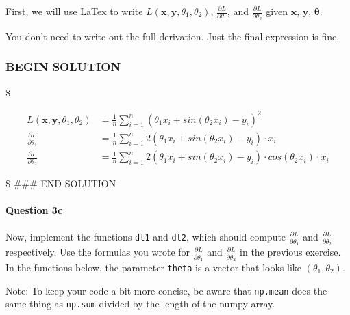 \documentclass[11pt]{article}
\begin{document}
First, we will use LaTex to write
\(L(\textbf{x}, \textbf{y}, \theta_1, \theta_2)\),
\(\frac{\partial L }{\partial \theta_1}\), and
\(\frac{\partial L }{\partial \theta_2}\) given \(\textbf{x}\),
\(\textbf{y}\), \(\boldsymbol{\theta}\).

You don't need to write out the full derivation. Just the final
expression is fine.

    \subsubsection{BEGIN SOLUTION}\label{begin-solution}

\$

\begin{align*}
L(\textbf{x}, \textbf{y}, \theta_1, \theta_2) &= \frac{1}{n} \sum_{i=1}^n (\theta_1 x_i + sin(\theta_2 x_i) - y_i)^2 \\
\frac{\partial L}{\partial \theta_1} &= \frac{1}{n} \sum_{i=1}^n 2(\theta_1 x_i + sin(\theta_2 x_i) - y_i) \cdot x_i \\
\frac{\partial L}{\partial \theta_2} &= \frac{1}{n} \sum_{i=1}^n 2(\theta_1 x_i + sin(\theta_2 x_i) - y_i) \cdot cos(\theta_2 x_i)\cdot x_i
\end{align*}

\$ \#\#\# END SOLUTION

    \paragraph{Question 3c}\label{question-3c}

Now, implement the functions \texttt{dt1} and \texttt{dt2}, which should
compute \(\frac{\partial L }{\partial \theta_1}\) and
\(\frac{\partial L }{\partial \theta_2}\) respectively. Use the formulas
you wrote for \(\frac{\partial L }{\partial \theta_1}\) and
\(\frac{\partial L }{\partial \theta_2}\) in the previous exercise. In
the functions below, the parameter \texttt{theta} is a vector that looks
like \(( \theta_1, \theta_2 )\).

Note: To keep your code a bit more concise, be aware that
\texttt{np.mean} does the same thing as \texttt{np.sum} divided by the
length of the numpy array.
\end{document}
